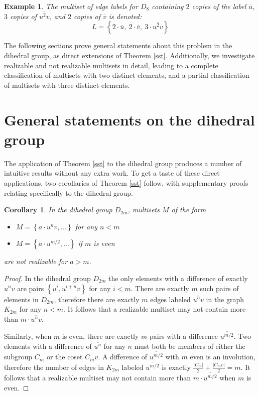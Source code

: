 \documentclass[12pt]{article}
\newtheorem{cor}[thm]{Corollary}
\newtheorem{exa}[thm]{Example}
\newcommand{\setof}[1]{\left\{#1\right\}}
\newcommand{\ol}[1]{\overline{#1}} %
\begin{document}
\begin{exa}
  The multiset of edge labels for $D_8$ containing $2$ copies of the label $\ol{u}$, $3$ copies of $\ol{u^2v}$,
  and $2$ copies of $\ol{v}$ is denoted:
  $$L = \setof{2 \cdot \ol{u},\ 2 \cdot \ol{v},\ 3 \cdot \ol{u^2v}}$$
\end{exa}

The following sections prove general statements about this problem in the dihedral group,
as direct extensions of Theorem \ref{sst}. Additionally, we investigate realizable and
not realizable multisets in detail, leading to a complete classification of multisets
with two distinct elements, and a partial classification of multisets with three
distinct elements.

\section{General statements on the dihedral group}
The application of Theorem \ref{sst} to the dihedral group produces a number
of intuitive results without any extra work.
To get a taste of these direct applications, two corollaries
of Theorem \ref{sst} follow, with supplementary proofs relating specifically to
the dihedral group.

\begin{cor} \label{leqm} In the dihedral group $D_{2m}$, multisets $M$ of the form
\begin{itemize}
\item $M = \setof{a \cdot u^nv, \dots}$ for any $n < m$
\item $M = \setof{a \cdot u^{m/2}, \dots}$ if $m$ is even
\end{itemize}
are not realizable for $a > m$.
\end{cor}
\begin{proof}
  In the dihedral group $D_{2m}$ the only elements with a difference of
  exactly $u^nv$ are pairs $\setof{u^i, u^{i + n}v}$ for any $i < m$. There are exactly $m$
  such pairs of elements in $D_{2m}$, therefore there are exactly $m$ edges
  labeled $\ol{u^nv}$ in the graph $K_{2m}$ for any $n < m$. It follows
  that a realizable multiset may not contain more than $m \cdot \ol{u^nv}$.

  Similarly, when $m$ is even, there are exactly $m$ pairs with a difference $\ol{u^{m/2}}$.
  Two elements with a difference of $\ol{u^n}$ for any $n$ must both be members of either the
  subgroup $C_m$ or the coset $C_mv$. A difference of $\ol{u^{m/2}}$ with $m$ even
  is an involution, therefore the number of edges in $K_{2m}$ labeled $\ol{u^{m/2}}$ is exactly
  $\frac{|C_m|}{2} + \frac{|C_mv|}{2} = m$. It follows that a realizable
  multiset may not contain more than $m \cdot \ol{u^{m/2}}$ when $m$ is even.
\end{proof}
\end{document}
